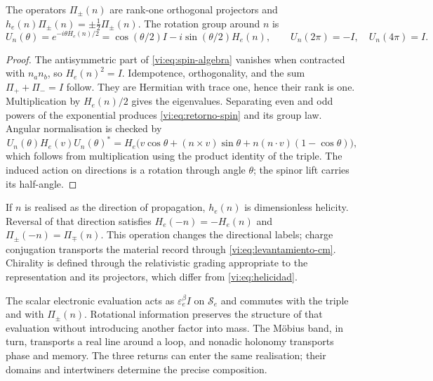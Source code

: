 \begin{proposition}
\label{vi:prop:helicidad}
The operators $\Pi_\pm(n)$ are rank-one orthogonal
projectors and $h_e(n)\Pi_\pm(n)=\pm\tfrac12\Pi_\pm(n)$.
The rotation group around $n$ is
\begin{equation}
 U_n(\theta)=e^{-i\theta H_e(n)/2}
 =\cos(\theta/2)I-i\sin(\theta/2)H_e(n),\qquad
 U_n(2\pi)=-I,\quad U_n(4\pi)=I.
 \label{vi:eq:retorno-spin}
\end{equation}
\end{proposition}
\begin{proof}
The antisymmetric part of \eqref{vi:eq:spin-algebra} vanishes
when contracted with $n_an_b$, so $H_e(n)^2=I$.
Idempotence, orthogonality, and the sum
$\Pi_++\Pi_-=I$ follow. They are Hermitian with trace one, hence their
rank is one. Multiplication by $H_e(n)/2$ gives the eigenvalues.
Separating even and odd powers of the exponential produces
\eqref{vi:eq:retorno-spin} and its group law. Angular normalisation
is checked by
\[
 U_n(\theta)H_e(v)U_n(\theta)^*
 =H_e\bigl(v\cos\theta+(n\times v)\sin\theta
       +n(n\cdot v)(1-\cos\theta)\bigr),
\]
which follows from multiplication using the product identity of the
triple. The induced action on directions is a rotation through
angle $\theta$; the spinor lift carries its half-angle.
\end{proof}

If $n$ is realised as the direction of propagation, $h_e(n)$ is
dimensionless helicity. Reversal of that direction satisfies
$H_e(-n)=-H_e(n)$ and $\Pi_\pm(-n)=\Pi_\mp(n)$.
This operation changes the directional labels; charge conjugation
transports the material record through
\eqref{vi:eq:levantamiento-cm}. Chirality is defined through
the relativistic grading appropriate to the representation and
its projectors, which differ from \eqref{vi:eq:helicidad}.

The scalar electronic evaluation acts as
$\varepsilon_e^\beta I$ on $\mathscr S_e$ and commutes with
the triple and with $\Pi_\pm(n)$. Rotational information preserves
the structure of that evaluation without introducing another factor into
mass. The Möbius band, in turn, transports a real
line around a loop, and nonadic holonomy transports
phase and memory. The three returns can enter the same
realisation; their domains and intertwiners determine the
precise composition.
